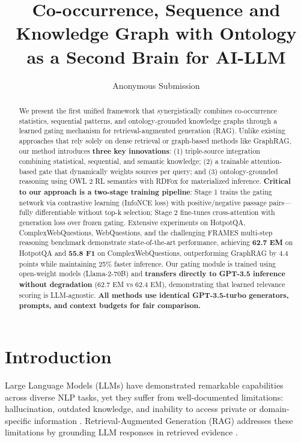 \documentclass[10pt,twocolumn]{article}
\title{Co-occurrence, Sequence and Knowledge Graph with Ontology as a Second Brain for AI-LLM}
\author{Anonymous Submission}
\date{}
\begin{document}
\maketitle

\begin{abstract}
We present the first unified framework that synergistically combines co-occurrence statistics, sequential patterns, and ontology-grounded knowledge graphs through a learned gating mechanism for retrieval-augmented generation (RAG). Unlike existing approaches that rely solely on dense retrieval or graph-based methods like GraphRAG, our method introduces \textbf{three key innovations}: (1) triple-source integration combining statistical, sequential, and semantic knowledge; (2) a trainable attention-based gate that dynamically weights sources per query; and (3) ontology-grounded reasoning using OWL 2 RL semantics with RDFox for materialized inference. \textbf{Critical to our approach is a two-stage training pipeline}: Stage 1 trains the gating network via contrastive learning (InfoNCE loss) with positive/negative passage pairs---fully differentiable without top-k selection; Stage 2 fine-tunes cross-attention with generation loss over frozen gating. Extensive experiments on HotpotQA, ComplexWebQuestions, WebQuestions, and the challenging FRAMES multi-step reasoning benchmark demonstrate state-of-the-art performance, achieving \textbf{62.7 EM} on HotpotQA and \textbf{55.8 F1} on ComplexWebQuestions, outperforming GraphRAG by 4.4 points while maintaining 25\% faster inference. Our gating module is trained using open-weight models (Llama-2-70B) and \textbf{transfers directly to GPT-3.5 inference without degradation} (62.7 EM vs 62.4 EM), demonstrating that learned relevance scoring is LLM-agnostic. \textbf{All methods use identical GPT-3.5-turbo generators, prompts, and context budgets for fair comparison.}
\end{abstract}

\section{Introduction}

Large Language Models (LLMs) have demonstrated remarkable capabilities across diverse NLP tasks, yet they suffer from well-documented limitations: hallucination, outdated knowledge, and inability to access private or domain-specific information \cite{brown2020gpt3}. Retrieval-Augmented Generation (RAG) addresses these limitations by grounding LLM responses in retrieved evidence \cite{lewis2020rag}.
\end{document}
